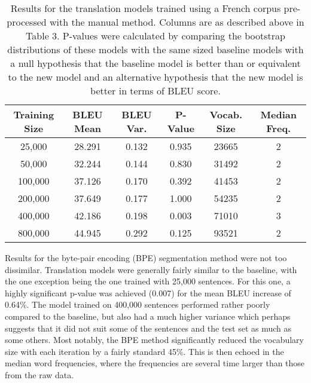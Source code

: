 \documentclass[11pt]{article}
\begin{document}
\begin{table}[h]
\centering
\begin{tabular}{|c|c|c|c|c|c|}
\hline
Training Size & BLEU Mean & BLEU Var. & P-Value & Vocab. Size & Median Freq. \\ \hline
25,000             & 28.291    & 0.132         & 0.935   & 23665           & 2                     \\
50,000             & 32.244    & 0.144         & 0.830   & 31492           & 2                     \\
100,000            & 37.126    & 0.170         & 0.392   & 41453           & 2                     \\
200,000            & 37.649    & 0.177         & 1.000   & 54235           & 2                     \\
400,000            & 42.186    & 0.198         & 0.003   & 71010           & 3                     \\
800,000            & 44.945    & 0.292         & 0.125   & 93521           & 2                     \\ \hline
\end{tabular}
\caption{Results for the translation models trained using a French corpus pre-processed with the manual method. Columns are as described above in Table 3. P-values were calculated by comparing the bootstrap distributions of these models with the same sized baseline models with a null hypothesis that the baseline model is better than or equivalent to the new model and an alternative hypothesis that the new model is better in terms of BLEU score.}
\label{tab:manual}
\end{table}

\bigskip

Results for the byte-pair encoding (BPE) segmentation method were not too dissimilar. Translation models were generally fairly similar to the baseline, with the one exception being the one trained with 25,000 sentences. For this one, a highly significant p-value was achieved (0.007) for the mean BLEU increase of 0.64\%. The model trained on 400,000 sentences performed rather poorly compared to the baseline, but also had a much higher variance which perhaps suggests that it did not suit some of the sentences and the test set as much as some others. Most notably, the BPE method significantly reduced the vocabulary size with each iteration by a fairly standard 45\%. This is then echoed in the median word frequencies, where the frequencies are several time larger than those from the raw data. 
\end{document}
